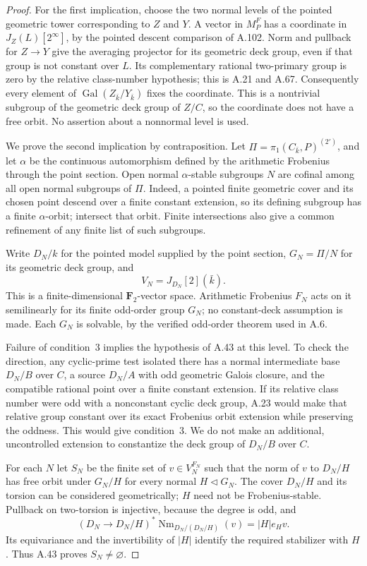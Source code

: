 \documentclass[11pt]{article}
\begin{document}
\begin{proof}
For the first implication, choose the two normal levels of the
pointed geometric tower corresponding to $Z$ and $Y$. A vector
in $M_P^F$ has a coordinate in $J_Z(L)[2^\infty]$, by the
pointed descent comparison of A.102. Norm and pullback for
$Z\to Y$ give the averaging projector for its geometric deck
group, even if that group is not constant over $L$. Its
complementary rational two-primary group is zero by the
relative class-number hypothesis; this is A.21 and A.67.
Consequently every element of $\operatorname{Gal}(Z_{\bar k}/Y_{\bar k})$
fixes the coordinate. This is a nontrivial subgroup of the
geometric deck group of $Z/C$, so the coordinate does not have
a free orbit. No assertion about a nonnormal level is used.

We prove the second implication by contraposition. Let
$\Pi=\pi_1(C_{\bar k},P)^{(2')}$, and let $\alpha$ be the
continuous automorphism defined by the arithmetic Frobenius
through the point section. Open normal $\alpha$-stable subgroups
$N$ are cofinal among all open normal subgroups of $\Pi$.
Indeed, a pointed finite geometric cover and its chosen point
descend over a finite constant extension, so its defining
subgroup has a finite $\alpha$-orbit; intersect that orbit.
Finite intersections also give a common refinement of any
finite list of such subgroups.

Write $D_N/k$ for the pointed model supplied by the point
section, $G_N=\Pi/N$ for its geometric deck group, and
\[
                  V_N=J_{D_N}[2](\bar k).
\]
This is a finite-dimensional $\mathbf F_2$-vector space.
Arithmetic Frobenius $F_N$ acts on it semilinearly for its
finite odd-order group $G_N$; no constant-deck assumption is
made. Each $G_N$ is solvable, by the verified odd-order theorem
used in A.6.

Failure of condition~3 implies the hypothesis of A.43 at this
level. To check the direction, any cyclic-prime test isolated
there has a normal intermediate base $D_N/B$ over $C$, a
source $D_N/A$ with odd geometric Galois closure, and the
compatible rational point over a finite constant extension.
If its relative class number were odd with a nonconstant
cyclic deck group, A.23 would make that relative group constant
over its exact Frobenius orbit extension while preserving the
oddness. This would give condition~3. We do not make an
additional, uncontrolled extension to constantize the deck
group of $D_N/B$ over $C$.

For each $N$ let $S_N$ be the finite set of $v\in V_N^{F_N}$
such that the norm of $v$ to $D_N/H$ has free orbit under
$G_N/H$ for every normal $H\triangleleft G_N$. The cover
$D_N/H$ and its torsion can be considered geometrically;
$H$ need not be Frobenius-stable. Pullback on two-torsion is
injective, because the degree is odd, and
\[
 (D_N\to D_N/H)^*\operatorname{Nm}_{D_N/(D_N/H)}(v)
                         =|H|e_Hv.
\]
Its equivariance and the invertibility of $|H|$ identify the
required stabilizer with $H$. Thus A.43 proves $S_N\ne\varnothing$.


\end{proof}
\end{document}
